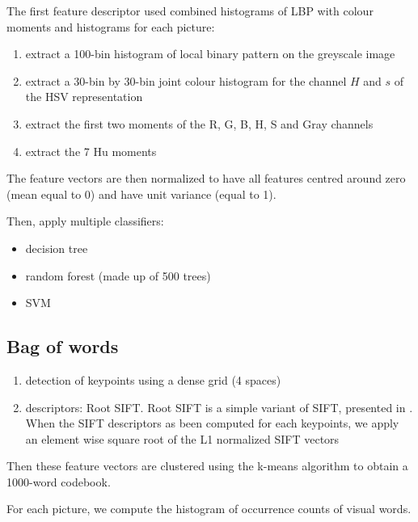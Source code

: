 The first feature descriptor used combined histograms of LBP with colour moments and histograms for each picture:
\begin{enumerate}
    \item extract a 100-bin histogram of local binary pattern on the greyscale image
    \item extract a 30-bin by 30-bin joint colour histogram for the channel $H$ and $s$ of the HSV  representation
    \item extract the first two moments of the R, G, B, H, S and Gray channels
    \item extract the 7 Hu moments
\end{enumerate}

The feature vectors are then normalized to have all features centred around zero (mean equal to 0) and have unit variance (equal to 1).

Then, apply multiple classifiers:
\begin{itemize}
    \item decision tree
    \item random forest (made up of 500 trees)
    \item SVM
\end{itemize}


\subsection{Bag of words}

\begin{enumerate}
    \item detection of keypoints using a dense grid (4 spaces)
    \item descriptors: Root SIFT. Root SIFT is a simple variant of SIFT, presented in \cite{Arandjelovic2012}. When the SIFT descriptors as been computed for each keypoints, we apply an element wise square root of the L1 normalized SIFT vectors
\end{enumerate}

Then these feature vectors are clustered using the k-means algorithm to obtain a 1000-word codebook.

For each picture, we compute the histogram of occurrence counts of visual words.

